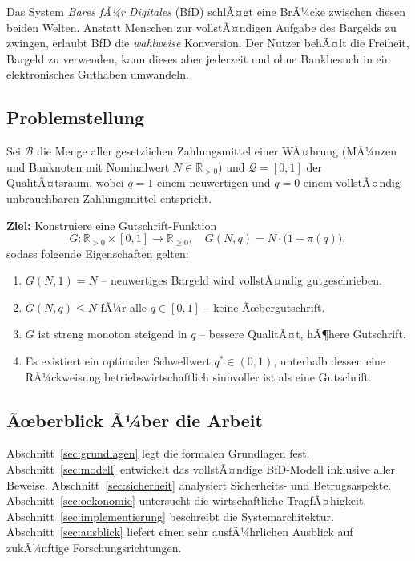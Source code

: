 ﻿\documentclass[a4paper,12pt]{article}
\theoremstyle{definition}
\begin{document}
Das System \emph{Bares fÃ¼r Digitales} (BfD) schlÃ¤gt eine BrÃ¼cke zwischen diesen
beiden Welten.  Anstatt Menschen zur vollstÃ¤ndigen Aufgabe des Bargelds zu zwingen,
erlaubt BfD die \emph{wahlweise} Konversion.  Der Nutzer behÃ¤lt die Freiheit,
Bargeld zu verwenden, kann dieses aber jederzeit und ohne Bankbesuch in ein
elektronisches Guthaben umwandeln.

\subsection{Problemstellung}

Sei $\mathcal{B}$ die Menge aller gesetzlichen Zahlungsmittel einer WÃ¤hrung
(MÃ¼nzen und Banknoten mit Nominalwert $N \in \mathbb{R}_{>0}$) und
$\mathcal{Q} = [0,1]$ der QualitÃ¤tsraum, wobei $q = 1$ einem neuwertigen
und $q = 0$ einem vollstÃ¤ndig unbrauchbaren Zahlungsmittel entspricht.

\textbf{Ziel:} Konstruiere eine Gutschrift-Funktion
\[
G : \mathbb{R}_{>0} \times [0,1] \to \mathbb{R}_{\geq 0},
\quad
G(N, q) = N \cdot \bigl(1 - \pi(q)\bigr),
\]
sodass folgende Eigenschaften gelten:
\begin{enumerate}
  \item $G(N, 1) = N$ -- neuwertiges Bargeld wird vollstÃ¤ndig gutgeschrieben.
  \item $G(N, q) \leq N$ fÃ¼r alle $q \in [0,1]$ -- keine Ãœbergutschrift.
  \item $G$ ist streng monoton steigend in $q$ -- bessere QualitÃ¤t, hÃ¶here Gutschrift.
  \item Es existiert ein optimaler Schwellwert $q^* \in (0,1)$, unterhalb dessen
        eine RÃ¼ckweisung betriebswirtschaftlich sinnvoller ist als eine Gutschrift.
\end{enumerate}

\subsection{Ãœberblick Ã¼ber die Arbeit}

Abschnitt~\ref{sec:grundlagen} legt die formalen Grundlagen fest.
Abschnitt~\ref{sec:modell} entwickelt das vollstÃ¤ndige BfD-Modell inklusive
aller Beweise.  Abschnitt~\ref{sec:sicherheit} analysiert Sicherheits- und
Betrugsaspekte.  Abschnitt~\ref{sec:oekonomie} untersucht die wirtschaftliche
TragfÃ¤higkeit.  Abschnitt~\ref{sec:implementierung} beschreibt die
Systemarchitektur.  Abschnitt~\ref{sec:ausblick} liefert einen sehr ausfÃ¼hrlichen
Ausblick auf zukÃ¼nftige Forschungsrichtungen.
\end{document}
